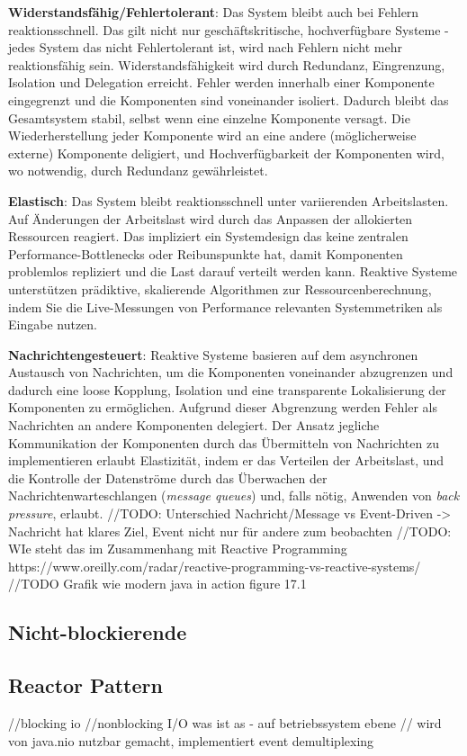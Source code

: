 \textbf{Widerstandsfähig/Fehlertolerant}: Das System bleibt auch bei Fehlern reaktionsschnell. Das gilt nicht nur geschäftskritische, hochverfügbare Systeme -
jedes System das nicht Fehlertolerant ist, wird nach Fehlern nicht mehr reaktionsfähig sein.
Widerstandsfähigkeit wird durch Redundanz, Eingrenzung, Isolation und Delegation erreicht.
Fehler werden innerhalb einer Komponente eingegrenzt und die Komponenten sind voneinander isoliert. Dadurch bleibt das Gesamtsystem stabil, selbst
wenn eine einzelne Komponente versagt.
Die Wiederherstellung jeder Komponente wird an eine andere (möglicherweise externe) Komponente deligiert, und
Hochverfügbarkeit der Komponenten wird, wo notwendig, durch Redundanz gewährleistet.

\textbf{Elastisch}: Das System bleibt reaktionsschnell unter variierenden Arbeitslasten. Auf Änderungen der Arbeitslast wird durch das Anpassen der
allokierten Ressourcen reagiert. Das impliziert ein Systemdesign das keine zentralen Performance-Bottlenecks oder Reibunspunkte hat, damit
Komponenten problemlos repliziert und die Last darauf verteilt werden kann.
Reaktive Systeme unterstützen prädiktive, skalierende Algorithmen zur Ressourcenberechnung,
indem Sie die Live-Messungen von Performance relevanten Systemmetriken als Eingabe nutzen.

\textbf{Nachrichtengesteuert}: Reaktive Systeme basieren auf dem asynchronen Austausch von Nachrichten, um die Komponenten voneinander abzugrenzen und dadurch
eine loose Kopplung, Isolation und eine transparente Lokalisierung der Komponenten zu ermöglichen.
Aufgrund dieser Abgrenzung werden Fehler als Nachrichten an andere Komponenten delegiert.
Der Ansatz jegliche Kommunikation der Komponenten durch das Übermitteln von Nachrichten zu implementieren erlaubt Elastizität,
indem er das Verteilen der Arbeitslast, und die Kontrolle der Datenströme durch das Überwachen der Nachrichtenwarteschlangen
(\textit{message queues}) und, falls nötig, Anwenden von \textit{back pressure}, erlaubt.\parencite{ReactiveSystems}
//TODO: Unterschied Nachricht/Message vs Event-Driven -> Nachricht hat klares Ziel, Event nicht nur für andere zum beobachten
//TODO: WIe steht das im Zusammenhang mit Reactive Programming https://www.oreilly.com/radar/reactive-programming-vs-reactive-systems/
//TODO Grafik wie modern java in action figure 17.1
\subsection{Nicht-blockierende }
\subsection{Reactor Pattern}
\label{section:reactor_pattern}
//blocking io
//nonblocking I/O was ist as - auf betriebssystem ebene
// wird von java.nio nutzbar gemacht, implementiert event demultiplexing

